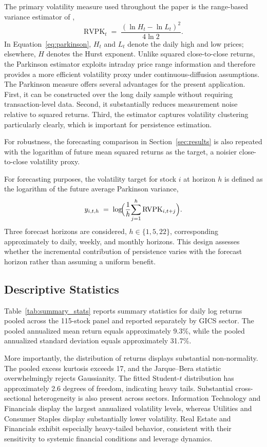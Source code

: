 \documentclass[jrfm,article,submit,moreauthors,pdftex]{Definitions/mdpi}
\begin{document}
The primary volatility measure used throughout the paper is the range-based
variance estimator of \citet{parkinson1980extreme},
\begin{equation}
  \mathrm{RVPK}_t \;=\; \frac{(\ln H_t - \ln L_t)^2}{4\ln 2}.
  \label{eq:parkinson}
\end{equation}
In Equation~\eqref{eq:parkinson}, $H_t$ and $L_t$ denote the daily high
and low prices; elsewhere, $H$ denotes the Hurst exponent. Unlike squared
close-to-close returns, the Parkinson estimator exploits intraday price
range information and therefore provides a more efficient volatility proxy
under continuous-diffusion assumptions. The Parkinson measure offers several
advantages for the present application. First, it can be constructed
over the long daily sample without requiring transaction-level data. Second,
it substantially reduces measurement noise relative to squared returns.
Third, the estimator captures volatility clustering particularly clearly,
which is important for persistence estimation.

For robustness, the forecasting comparison in Section~\ref{sec:results}
is also repeated with the logarithm of future mean squared returns as the
target, a noisier close-to-close volatility proxy.

For forecasting purposes, the volatility target for stock $i$ at horizon
$h$ is defined as the logarithm of the future average Parkinson variance,
\begin{equation}
  y_{i,t,h} \;=\; \log\!\Bigl(\frac{1}{h}\!\sum_{j=1}^{h}
  \mathrm{RVPK}_{i,t+j}\Bigr).
\end{equation}
Three forecast horizons are considered, $h\in\{1,5,22\}$, corresponding
approximately to daily, weekly, and monthly horizons. This design assesses
whether the incremental contribution of persistence varies with the
forecast horizon rather than assuming a uniform benefit.

\subsection{Descriptive Statistics}

Table~\ref{tab:summary_stats} reports summary statistics for daily log
returns pooled across the 115-stock panel and reported separately by GICS sector.
The pooled annualized mean return equals approximately 9.3\%, while the
pooled annualized standard deviation equals approximately 31.7\%.

More importantly, the distribution of returns displays substantial
non-normality. The pooled excess kurtosis exceeds 17, and the Jarque--Bera
statistic \citep{jarque1980efficient} overwhelmingly rejects Gaussianity. The fitted Student-$t$
distribution has approximately 2.6 degrees of freedom, indicating heavy
tails. Substantial cross-sectional heterogeneity is also present
across sectors. Information Technology and Financials display the largest
annualized volatility levels, whereas Utilities and Consumer Staples
display substantially lower volatility. Real Estate and Financials exhibit
especially heavy-tailed behavior, consistent with their sensitivity to
systemic financial conditions and leverage dynamics.
\end{document}
